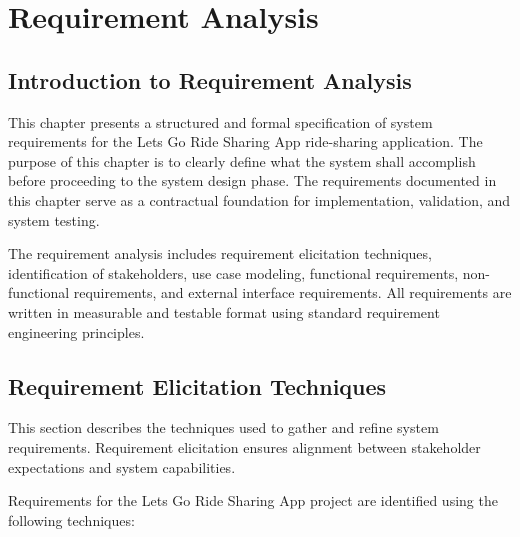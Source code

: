 
\chapter{Requirement Analysis}

\section{Introduction to Requirement Analysis}

This chapter presents a structured and formal specification of system requirements for the Lets Go Ride Sharing App ride-sharing application. The purpose of this chapter is to clearly define what the system shall accomplish before proceeding to the system design phase. The requirements documented in this chapter serve as a contractual foundation for implementation, validation, and system testing.

The requirement analysis includes requirement elicitation techniques, identification of stakeholders, use case modeling, functional requirements, non-functional requirements, and external interface requirements. All requirements are written in measurable and testable format using standard requirement engineering principles.

\section{Requirement Elicitation Techniques}

This section describes the techniques used to gather and refine system requirements. Requirement elicitation ensures alignment between stakeholder expectations and system capabilities.

Requirements for the Lets Go Ride Sharing App project are identified using the following techniques:

